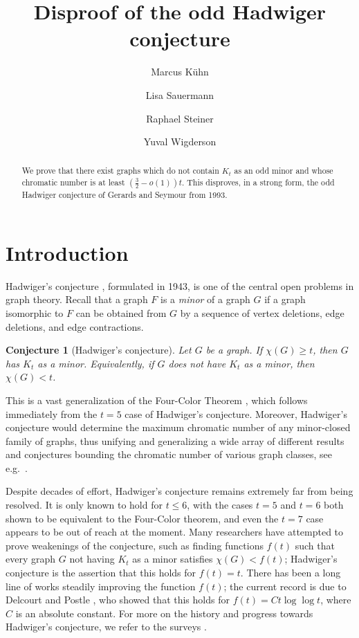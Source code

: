\documentclass[11pt,reqno,oneside]{amsart}
\title{Disproof of the odd Hadwiger conjecture}
\author{Marcus K\"uhn \and Lisa Sauermann \and Raphael Steiner \and Yuval Wigderson}
\date{}
\newtheorem{conjecture}[theorem]{Conjecture}
\theoremstyle{definition}
\newcommand\1{\mathbf{1}}
\let\leq\leqslant
\let\geq\geqslant
\begin{document}
\begin{abstract}
	We prove that there exist graphs which do not contain $K_t$ as an odd minor and whose chromatic number is at least $(\frac 32-o(1))t$. This disproves, in a strong form, the odd Hadwiger conjecture of Gerards and Seymour from 1993. 
\end{abstract}
\maketitle



\section{Introduction}


Hadwiger's conjecture \cite{MR12237}, formulated in 1943, is one of the central open problems in graph theory. Recall that a graph $F$ is a \emph{minor} of a graph $G$ if a graph isomorphic to $F$ can be obtained from $G$ by a sequence of vertex deletions, edge deletions, and edge contractions. 
\begin{conjecture}[Hadwiger's conjecture]
Let $G$ be a graph. If $\chi(G)\geq t$, then $G$ has $K_t$ as a minor. Equivalently, if $G$ does not have $K_t$ as a minor, then $\chi(G)<t$. 
\end{conjecture}
This is a vast generalization of the Four-Color Theorem \cite{MR543793,MR543792}, which follows immediately from the $t=5$ case of Hadwiger's conjecture. Moreover, Hadwiger's conjecture would determine the maximum chromatic number of any minor-closed family of graphs, thus unifying and generalizing a wide array of different results and conjectures bounding  the chromatic number of various graph classes, see e.g.\ \cite{MR228378,MR831801,MR1070462}.

Despite decades of effort, Hadwiger's conjecture remains extremely far from being resolved. It is only known to hold \cite{MR1238823} for $t \leq 6$, with the cases $t=5$ and $t=6$ both shown to be equivalent to the Four-Color theorem, and even the $t=7$ case appears to be out of reach at the moment. Many researchers have attempted to prove weakenings of the conjecture, such as finding functions $f(t)$ such that every graph $G$ not having $K_t$ as a minor satisfies $\chi(G)<f(t)$; Hadwiger's conjecture is the assertion that this holds for $f(t)=t$. There has been a long line of works \cite{MR779891,MR735367,MR713722,MR4576840,MR4866587} steadily improving the function $f(t)$; the current record is due to Delcourt and Postle \cite{MR4868948}, who showed that this holds for $f(t)=Ct\log \log t$, where $C$ is an absolute constant. 
For more on the history and progress towards Hadwiger's conjecture, we refer to the surveys \cite{MR4680416,MR3526944,MR1411244}.
\end{document}
